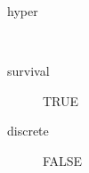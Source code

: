 \begin{description}
	\item[hyper]\ 
	 \item[ survival ] TRUE 
	 \item[ discrete ] FALSE 
\end{description}
